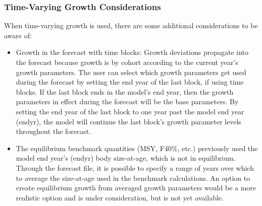 \subsubsection{Time-Varying Growth Considerations}
When time-varying growth is used, there are some additional considerations to be aware of:
\begin{itemize}
	\item Growth in the forecast with time blocks: Growth deviations propagate into the forecast because growth is by cohort according to the current year's growth parameters. The user can select which growth parameters get used during the forecast by setting the end year of the last block, if using time blocks. If the last block ends in the model's end year, then the growth parameters in effect during the forecast will be the base parameters.  By setting the end year of the last block to one year past the model end year (endyr), the model will continue the last block's growth parameter levels throughout the forecast.
	\item The equilibrium benchmark quantities (MSY, F40\%, etc.) previously used the model end year's (endyr) body size-at-age, which is not in equilibrium. Through the forecast file, it is possible to specify a range of years over which to average the size-at-age used in the benchmark calculations. An option to create equilibrium growth from averaged growth parameters would be a more realistic option and is under consideration, but is not yet available.
\end{itemize}

